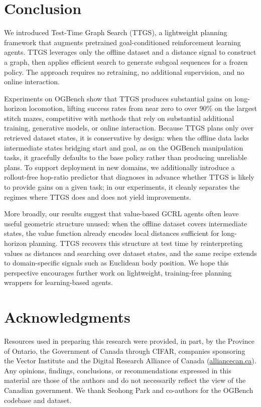 \documentclass{article} %
\begin{document}
\section{Conclusion}
We introduced Test-Time Graph Search (TTGS), a lightweight planning framework that augments pretrained goal-conditioned reinforcement learning agents. TTGS leverages only the offline dataset and a distance signal to construct a graph, then applies efficient search to generate subgoal sequences for a frozen policy. The approach requires no retraining, no additional supervision, and no online interaction.

Experiments on OGBench show that TTGS produces substantial gains on long-horizon locomotion, lifting success rates from near zero to over 90\% on the largest stitch mazes, competitive with methods that rely on substantial additional training, generative models, or online interaction. Because TTGS plans only over retrieved dataset states, it is conservative by design: when the offline data lacks intermediate states bridging start and goal, as on the OGBench manipulation tasks, it gracefully defaults to the base policy rather than producing unreliable plans. To support deployment in new domains, we additionally introduce a rollout-free hop-ratio predictor that diagnoses in advance whether TTGS is likely to provide gains on a given task; in our experiments, it cleanly separates the regimes where TTGS does and does not yield improvements.

More broadly, our results suggest that value-based GCRL agents often leave useful geometric structure unused: when the offline dataset covers intermediate states, the value function already encodes local distances sufficient for long-horizon planning. TTGS recovers this structure at test time by reinterpreting values as distances and searching over dataset states, and the same recipe extends to domain-specific signals such as Euclidean body position. We hope this perspective encourages further work on lightweight, training-free planning wrappers for learning-based agents.

\section*{Acknowledgments}
 Resources used in preparing this research were provided, in part, by the Province of Ontario, the Government of Canada through CIFAR, companies sponsoring the Vector Institute and the Digital Research Alliance of Canada  (\href{alliancecan.ca}{alliancecan.ca}). Any opinions, findings, conclusions, or recommendations expressed in this material are those of the authors and do not necessarily reflect the view of the Canadian government. We thank Seohong Park and co-authors for the OGBench codebase and dataset.
\end{document}
